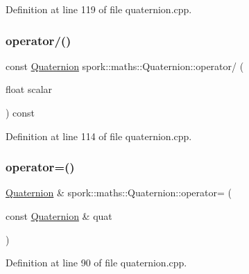 Definition at line 119 of file quaternion.\+cpp.

\mbox{\label{structspork_1_1maths_1_1_quaternion_ac2560ad77f0ca31d8f406933ee8d95b1}} 
\subsubsection{\texorpdfstring{operator/()}{operator/()}}
{\footnotesize\ttfamily const \hyperlink{structspork_1_1maths_1_1_quaternion}{Quaternion} spork\+::maths\+::\+Quaternion\+::operator/ (\begin{DoxyParamCaption}\item[{float}]{scalar }\end{DoxyParamCaption}) const}



Definition at line 114 of file quaternion.\+cpp.

\mbox{\label{structspork_1_1maths_1_1_quaternion_af4ef2e359db6e90c8b59e1cdaf0ce02d}} 
\subsubsection{\texorpdfstring{operator=()}{operator=()}}
{\footnotesize\ttfamily \hyperlink{structspork_1_1maths_1_1_quaternion}{Quaternion} \& spork\+::maths\+::\+Quaternion\+::operator= (\begin{DoxyParamCaption}\item[{const \hyperlink{structspork_1_1maths_1_1_quaternion}{Quaternion} \&}]{quat }\end{DoxyParamCaption})}



Definition at line 90 of file quaternion.\+cpp.

\mbox{\label{structspork_1_1maths_1_1_quaternion_a79245c7e245957602094ecf507e3cdc2}} 
